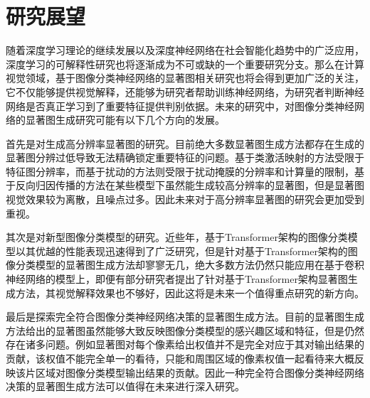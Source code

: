 \section{研究展望}
随着深度学习理论的继续发展以及深度神经网络在社会智能化趋势中的广泛应用，深度学习的可解释性研究也将逐渐成为不可或缺的一个重要研究分支。那么在计算视觉领域，基于图像分类神经网络的显著图相关研究也将会得到更加广泛的关注，它不仅能够提供视觉解释，还能够为研究者帮助训练神经网络，为研究者判断神经网络是否真正学习到了重要特征提供判别依据。未来的研究中，对图像分类神经网络的显著图生成研究可能有以下几个方向的发展。

首先是对生成高分辨率显著图的研究。目前绝大多数显著图生成方法都存在生成的显著图分辨过低导致无法精确锁定重要特征的问题。基于类激活映射的方法受限于特征图分辨率，而基于扰动的方法则受限于扰动掩膜的分辨率和计算量的限制，基于反向归因传播的方法在某些模型下虽然能生成较高分辨率的显著图，但是显著图视觉效果较为离散，且噪点过多。因此未来对于高分辨率显著图的研究会更加受到重视。

其次是对新型图像分类模型的研究。近些年，基于Transformer架构的图像分类模型以其优越的性能表现迅速得到了广泛研究，但是针对基于Transformer架构的图像分类模型的显著图生成方法却寥寥无几，绝大多数方法仍然只能应用在基于卷积神经网络的模型上，即便有部分研究者提出了针对基于Transformer架构显著图生成方法，其视觉解释效果也不够好，因此这将是未来一个值得重点研究的新方向。

最后是探索完全符合图像分类神经网络决策的显著图生成方法。目前的显著图生成方法给出的显著图虽然能够大致反映图像分类模型的感兴趣区域和特征，但是仍然存在诸多问题。例如显著图对每个像素给出权值并不是完全对应于其对输出结果的贡献，该权值不能完全单一的看待，只能和周围区域的像素权值一起看待来大概反映该片区域对图像分类模型输出结果的贡献。因此一种完全符合图像分类神经网络决策的显著图生成方法可以值得在未来进行深入研究。